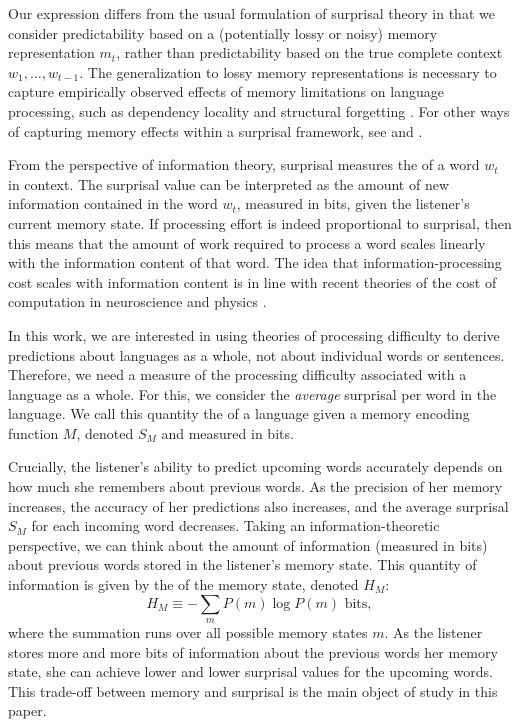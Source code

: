 Our expression differs from the usual formulation of surprisal theory in that we consider predictability based on a (potentially lossy or noisy) memory representation $m_t$, rather than predictability based on the true complete context $w_1, \dots, w_{t-1}$. The generalization to lossy memory representations is necessary to capture empirically observed effects of memory limitations on language processing, such as dependency locality and structural forgetting \citep{futrell-noisy-context-2017,futrell2019information}. For other ways of capturing memory effects within a surprisal framework, see \citet{demberg-incremental-2013} and \citet{rasmussen-2017-left}.

From the perspective of information theory, surprisal measures the  of a word $w_t$ in context. The surprisal value can be interpreted as the amount of new information contained in the word $w_t$, measured in bits, given the listener's current memory state. If processing effort is indeed proportional to surprisal, then this means that the amount of work required to process a word scales linearly with the information content of that word. The idea that information-processing cost scales with information content is in line with recent theories of the cost of computation in neuroscience \citep{friston2010free,zenon2019information} and physics \citep{still2012thermodynamics}. 

In this work, we are interested in using theories of processing difficulty to derive predictions about languages as a whole, not about individual words or sentences. Therefore, we need a measure of the processing difficulty associated with a language as a whole. For this, we consider the \emph{average} surprisal per word in the language. We call this quantity the  of a language given a memory encoding function $M$, denoted $S_M$ and measured in bits.

Crucially, the listener's ability to predict upcoming words accurately depends on how much she remembers about previous words. As the precision of her memory increases, the accuracy of her predictions also increases, and the average surprisal $S_M$ for each incoming word decreases. Taking an information-theoretic perspective, we can think about the amount of information (measured in bits) about previous words stored in the listener's memory state. This quantity of information is given by the  of the memory state, denoted $H_M$:
\begin{equation}
    H_M \equiv - \sum_m P(m) \log P(m) \text{ bits},
\end{equation}
where the summation runs over all possible memory states $m$. As the listener stores more and more bits of information about the previous words her memory state, she can achieve lower and lower surprisal values for the upcoming words. This trade-off between memory and surprisal is the main object of study in this paper.


